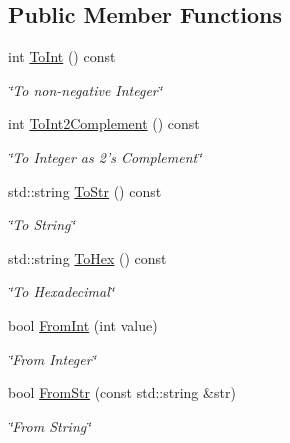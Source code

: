 \subsection*{Public Member Functions}
\begin{DoxyCompactItemize}
\item 
int \hyperlink{classWord_acf9a6c3d9cf07d66da592ec76f572464}{ToInt} () const 
\begin{DoxyCompactList}\small\item\em \char`\"{}To non-\/negative Integer\char`\"{} \item\end{DoxyCompactList}\item 
int \hyperlink{classWord_a4116e08d36472a287c06a4aa14e7ed4f}{ToInt2Complement} () const 
\begin{DoxyCompactList}\small\item\em \char`\"{}To Integer as 2's Complement\char`\"{} \item\end{DoxyCompactList}\item 
std::string \hyperlink{classWord_a5f8c5dcdb847ed96021ef9282ccc7e76}{ToStr} () const 
\begin{DoxyCompactList}\small\item\em \char`\"{}To String\char`\"{} \item\end{DoxyCompactList}\item 
std::string \hyperlink{classWord_af71af6fa290db8e9b4719c2b95ba9af0}{ToHex} () const 
\begin{DoxyCompactList}\small\item\em \char`\"{}To Hexadecimal\char`\"{} \item\end{DoxyCompactList}\item 
bool \hyperlink{classWord_aed80a61d7e2da2dbcde483058acd4259}{FromInt} (int value)
\begin{DoxyCompactList}\small\item\em \char`\"{}From Integer\char`\"{} \item\end{DoxyCompactList}\item 
bool \hyperlink{classWord_a0b255da1e924b2ab520cc5ca271bacf0}{FromStr} (const std::string \&str)
\begin{DoxyCompactList}\small\item\em \char`\"{}From String\char`\"{} \item\end{DoxyCompactList}\item 

\end{DoxyCompactItemize}
